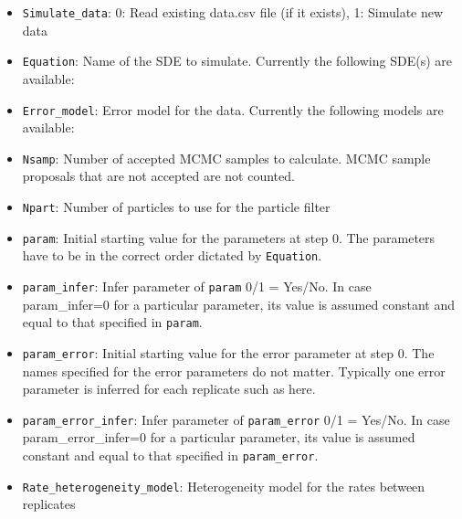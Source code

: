 \documentclass[]{article}   %
\begin{document}
\begin{itemize}
\item {\tt{Simulate\_data}}: 0: Read existing data.csv file (if it exists), 1: Simulate new data 
\item {\tt{Equation}}: Name of the SDE to simulate. Currently the following SDE(s) are available:
\item {\tt{Error\_model}}: Error model for the data. Currently the following models are available:
\item {\tt{Nsamp}}: Number of accepted MCMC samples to calculate. MCMC sample proposals that are not accepted are not counted.
\item {\tt{Npart}}: Number of particles to use for the particle filter
\item {\tt{param}}: Initial starting value for the parameters at step 0. The parameters have to be in the correct order dictated by {\tt Equation}.
\item {\tt{param\_infer}}: Infer parameter of {\tt param} 0/1 = Yes/No. In case param\_infer=0 for a particular parameter, its value is assumed constant and equal to that specified in {\tt param}.
\item {\tt{param\_error}}: Initial starting value for the error parameter at step 0. The names specified for the error parameters do not matter. Typically one error parameter is inferred for each replicate such as here.
\item {\tt{param\_error\_infer}}: Infer parameter of {\tt param\_error} 0/1 = Yes/No. In case param\_error\_infer=0 for a particular parameter, its value is assumed constant and equal to that specified in {\tt param\_error}.
\item {\tt{Rate\_heterogeneity\_model}}:
Heterogeneity model for the rates between replicates
\end{itemize}
\end{document}
